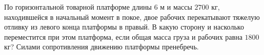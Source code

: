 По горизонтальной товарной платформе длины $6$ м и массы $2700$ кг, 
находившейся в начальный момент в покое, двое рабочих перекатывают 
тяжелую отливку из левого конца платформы в правый. В какую сторону и
насколько переместится при этом платформа, если общая масса груза и 
рабочих равна $1800$ кг? Силами сопротивления движению платформы пренебречь. 
